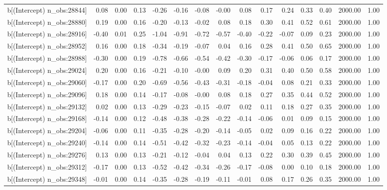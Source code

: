 \begin{table}[ht]
\begin{tabular}{rrrrrrrrrrrrrrr}
  b[(Intercept) n\_obs:28844] & 0.08 & 0.00 & 0.13 & -0.26 & -0.16 & -0.08 & -0.00 & 0.08 & 0.17 & 0.24 & 0.33 & 0.40 & 2000.00 & 1.00 \\ 
  b[(Intercept) n\_obs:28880] & 0.19 & 0.00 & 0.16 & -0.20 & -0.13 & -0.02 & 0.08 & 0.18 & 0.30 & 0.41 & 0.52 & 0.61 & 2000.00 & 1.00 \\ 
  b[(Intercept) n\_obs:28916] & -0.40 & 0.01 & 0.25 & -1.04 & -0.91 & -0.72 & -0.57 & -0.40 & -0.22 & -0.07 & 0.09 & 0.23 & 2000.00 & 1.00 \\ 
  b[(Intercept) n\_obs:28952] & 0.16 & 0.00 & 0.18 & -0.34 & -0.19 & -0.07 & 0.04 & 0.16 & 0.28 & 0.41 & 0.50 & 0.65 & 2000.00 & 1.00 \\ 
  b[(Intercept) n\_obs:28988] & -0.30 & 0.00 & 0.19 & -0.78 & -0.66 & -0.54 & -0.42 & -0.30 & -0.17 & -0.06 & 0.06 & 0.17 & 2000.00 & 1.00 \\ 
  b[(Intercept) n\_obs:29024] & 0.20 & 0.00 & 0.16 & -0.21 & -0.10 & -0.00 & 0.09 & 0.20 & 0.31 & 0.40 & 0.50 & 0.58 & 2000.00 & 1.00 \\ 
  b[(Intercept) n\_obs:29060] & -0.17 & 0.00 & 0.20 & -0.69 & -0.56 & -0.43 & -0.31 & -0.18 & -0.04 & 0.08 & 0.21 & 0.33 & 2000.00 & 1.00 \\ 
  b[(Intercept) n\_obs:29096] & 0.18 & 0.00 & 0.14 & -0.17 & -0.08 & -0.00 & 0.08 & 0.18 & 0.27 & 0.35 & 0.44 & 0.52 & 2000.00 & 1.00 \\ 
  b[(Intercept) n\_obs:29132] & 0.02 & 0.00 & 0.13 & -0.29 & -0.23 & -0.15 & -0.07 & 0.02 & 0.11 & 0.18 & 0.27 & 0.35 & 2000.00 & 1.00 \\ 
  b[(Intercept) n\_obs:29168] & -0.14 & 0.00 & 0.12 & -0.48 & -0.38 & -0.28 & -0.22 & -0.14 & -0.06 & 0.01 & 0.09 & 0.15 & 2000.00 & 1.00 \\ 
  b[(Intercept) n\_obs:29204] & -0.06 & 0.00 & 0.11 & -0.35 & -0.28 & -0.20 & -0.14 & -0.05 & 0.02 & 0.09 & 0.16 & 0.22 & 2000.00 & 1.00 \\ 
  b[(Intercept) n\_obs:29240] & -0.14 & 0.00 & 0.14 & -0.51 & -0.42 & -0.32 & -0.23 & -0.14 & -0.04 & 0.05 & 0.13 & 0.22 & 2000.00 & 1.00 \\ 
  b[(Intercept) n\_obs:29276] & 0.13 & 0.00 & 0.13 & -0.21 & -0.12 & -0.04 & 0.04 & 0.13 & 0.22 & 0.30 & 0.39 & 0.45 & 2000.00 & 1.00 \\ 
  b[(Intercept) n\_obs:29312] & -0.17 & 0.00 & 0.13 & -0.52 & -0.42 & -0.34 & -0.26 & -0.17 & -0.08 & 0.00 & 0.10 & 0.18 & 2000.00 & 1.00 \\ 
  b[(Intercept) n\_obs:29348] & -0.01 & 0.00 & 0.14 & -0.35 & -0.28 & -0.19 & -0.11 & -0.01 & 0.08 & 0.17 & 0.26 & 0.35 & 2000.00 & 1.00 \\ 

\end{tabular}
\end{table}
